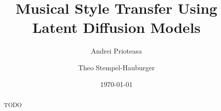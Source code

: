 \documentclass[12pt]{article}
\title{Musical Style Transfer Using Latent Diffusion Models}
\author{Andrei Prioteasa \and Theo Stempel-Hauburger}
\date{\today}
\begin{document}
\maketitle

\tableofcontents
\begin{abstract}
    TODO
\end{abstract}











\end{document}

